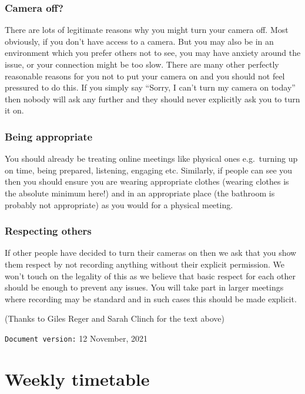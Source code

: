 \documentclass[
]{book}
\begin{document}
\hypertarget{off}{%
\subsection{Camera off?}\label{off}}

There are lots of legitimate reasons why you might turn your camera off. Most obviously, if you don't have access to a camera. But you may also be in an environment which you prefer others not to see, you may have anxiety around the issue, or your connection might be too slow. There are many other perfectly reasonable reasons for you not to put your camera on and you should not feel pressured to do this. If you simply say ``Sorry, I can't turn my camera on today'' then nobody will ask any further and they should never explicitly ask you to turn it on.

\hypertarget{being}{%
\subsection{Being appropriate}\label{being}}

You should already be treating online meetings like physical ones e.g.~turning up on time, being prepared, listening, engaging etc. Similarly, if people can see you then you should ensure you are wearing appropriate clothes (wearing clothes is the absolute minimum here!) and in an appropriate place (the bathroom is probably not appropriate) as you would for a physical meeting.

\hypertarget{respecting}{%
\subsection{Respecting others}\label{respecting}}

If other people have decided to turn their cameras on then we ask that you show them respect by not recording anything without their explicit permission. We won't touch on the legality of this as we believe that basic respect for each other should be enough to prevent any issues. You will take part in larger meetings where recording may be standard and in such cases this should be made explicit.

(Thanks to Giles Reger and Sarah Clinch for the text above)

\texttt{Document\ version:} 12 November, 2021

\hypertarget{timetabling}{%
\chapter*{Weekly timetable}\label{timetabling}}
\end{document}
